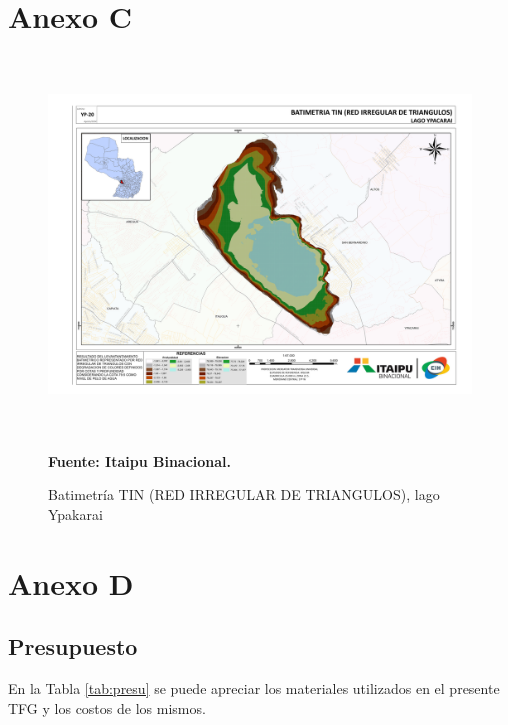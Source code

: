 \begin{appendices}
\chapter*{Anexo C}
\begin{figure}[H]
    \centering
    \includegraphics[width=150mm, height=100mm]{Imagenes/cap3/Batimetria_lago_Ypacarai_TIN_A3.pdf}
    \caption[BATIMETRIA TIN lago Ypakarai]{Batimetr\'ia TIN (RED IRREGULAR DE TRIANGULOS), lago Ypakarai} \textbf{Fuente: Itaipu Binacional.}
    \label{fig:ModuloFrontal}
\end{figure}


\chapter*{Anexo D}
\section[Presupuesto]{Presupuesto}
En la Tabla \ref{tab:presu} se puede apreciar los materiales utilizados en el presente TFG y los costos de los mismos.


\end{appendices}
